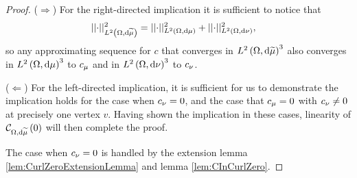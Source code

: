 \begin{proof}
	($\Rightarrow$) For the right-directed implication it is sufficient to notice that 
	\begin{align*}
		\lvert\lvert \cdot \rvert\rvert_{L^{2}\left( \Omega,\mathrm{d} \widetilde{\mu} \right)}^2 &= \lvert\lvert \cdot \rvert\rvert_{L^{2}\left( \Omega,\mathrm{d} \mu \right)}^2 + \lvert\lvert \cdot \rvert\rvert_{L^{2}\left( \Omega,\mathrm{d} \nu \right)}^2,
	\end{align*}
	so any approximating sequence for $c$ that converges in $L^{2}\left( \Omega,\mathrm{d} \widetilde{\mu} \right)^3$ also converges in $L^{2}\left( \Omega,\mathrm{d} \mu \right)^3$ to $c_{\mu}$ and in $L^{2}\left( \Omega,\mathrm{d} \nu \right)^3$ to $c_{\nu}$.
	
	($\Leftarrow$) For the left-directed implication, it is sufficient for us to demonstrate the implication holds for the case when $c_{\nu}=0$, and the case that $c_{\mu}=0$ with $c_{\nu}\neq0$ at precisely one vertex $v$.
	Having shown the implication in these cases, linearity of $\mathcal{C}_{ \Omega, \mathrm{d}\widetilde{\mu}}\left( 0 \right)$ will then complete the proof.
	
	The case when $c_{\nu}=0$ is handled by the extension lemma \ref{lem:CurlZeroExtensionLemma} and lemma \ref{lem:CInCurlZero}.
	

\end{proof}
